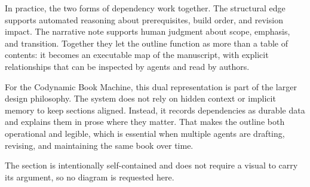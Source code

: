 \documentclass[11pt]{article}
\begin{document}
In practice, the two forms of dependency work together. The structural edge supports automated reasoning about prerequisites, build order, and revision impact. The narrative note supports human judgment about scope, emphasis, and transition. Together they let the outline function as more than a table of contents: it becomes an executable map of the manuscript, with explicit relationships that can be inspected by agents and read by authors.

For the Codynamic Book Machine, this dual representation is part of the larger design philosophy. The system does not rely on hidden context or implicit memory to keep sections aligned. Instead, it records dependencies as durable data and explains them in prose where they matter. That makes the outline both operational and legible, which is essential when multiple agents are drafting, revising, and maintaining the same book over time.

The section is intentionally self-contained and does not require a visual to carry its argument, so no diagram is requested here.
\end{document}

